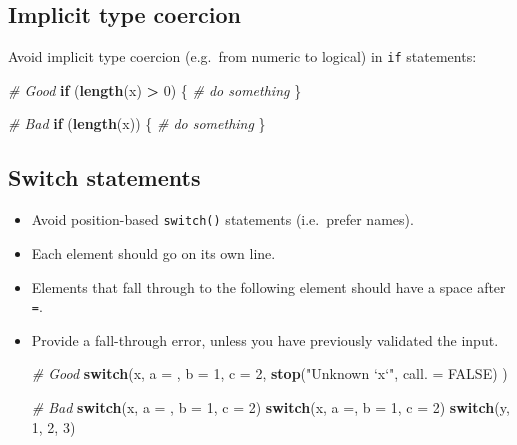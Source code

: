 \documentclass[
]{book}
\newenvironment{Shaded}{\begin{snugshade}}{\end{snugshade}}
\newcommand{\CommentTok}[1]{\textcolor[rgb]{0.56,0.35,0.01}{\textit{#1}}}
\newcommand{\ControlFlowTok}[1]{\textcolor[rgb]{0.13,0.29,0.53}{\textbf{#1}}}
\newcommand{\DataTypeTok}[1]{\textcolor[rgb]{0.13,0.29,0.53}{#1}}
\newcommand{\DecValTok}[1]{\textcolor[rgb]{0.00,0.00,0.81}{#1}}
\newcommand{\KeywordTok}[1]{\textcolor[rgb]{0.13,0.29,0.53}{\textbf{#1}}}
\newcommand{\NormalTok}[1]{#1}
\newcommand{\OperatorTok}[1]{\textcolor[rgb]{0.81,0.36,0.00}{\textbf{#1}}}
\newcommand{\OtherTok}[1]{\textcolor[rgb]{0.56,0.35,0.01}{#1}}
\newcommand{\StringTok}[1]{\textcolor[rgb]{0.31,0.60,0.02}{#1}}
\begin{document}
\hypertarget{implicit-type-coercion}{%
\subsection{Implicit type coercion}\label{implicit-type-coercion}}

Avoid implicit type coercion (e.g.~from numeric to logical) in \texttt{if} statements:

\begin{Shaded}
\begin{Highlighting}[]
\CommentTok{# Good}
\ControlFlowTok{if}\NormalTok{ (}\KeywordTok{length}\NormalTok{(x) }\OperatorTok{>}\StringTok{ }\DecValTok{0}\NormalTok{) \{}
    \CommentTok{# do something}
\NormalTok{\}}

\CommentTok{# Bad}
\ControlFlowTok{if}\NormalTok{ (}\KeywordTok{length}\NormalTok{(x)) \{}
    \CommentTok{# do something}
\NormalTok{\}}
\end{Highlighting}
\end{Shaded}

\hypertarget{switch-statements}{%
\subsection{Switch statements}\label{switch-statements}}

\begin{itemize}
\item
  Avoid position-based \texttt{switch()} statements (i.e.~prefer names).
\item
  Each element should go on its own line.
\item
  Elements that fall through to the following element should have a space after
  \texttt{=}.
\item
  Provide a fall-through error, unless you have previously validated the input.

\begin{Shaded}
\begin{Highlighting}[]
\CommentTok{# Good }
\ControlFlowTok{switch}\NormalTok{(x, }
    \DataTypeTok{a =}\NormalTok{ ,}
    \DataTypeTok{b =} \DecValTok{1}\NormalTok{, }
    \DataTypeTok{c =} \DecValTok{2}\NormalTok{,}
    \KeywordTok{stop}\NormalTok{(}\StringTok{"Unknown `x`"}\NormalTok{, }\DataTypeTok{call. =} \OtherTok{FALSE}\NormalTok{)}
\NormalTok{)}

\CommentTok{# Bad}
\ControlFlowTok{switch}\NormalTok{(x, }\DataTypeTok{a =}\NormalTok{ , }\DataTypeTok{b =} \DecValTok{1}\NormalTok{, }\DataTypeTok{c =} \DecValTok{2}\NormalTok{)}
\ControlFlowTok{switch}\NormalTok{(x, }\DataTypeTok{a =}\NormalTok{, }\DataTypeTok{b =} \DecValTok{1}\NormalTok{, }\DataTypeTok{c =} \DecValTok{2}\NormalTok{)}
\ControlFlowTok{switch}\NormalTok{(y, }\DecValTok{1}\NormalTok{, }\DecValTok{2}\NormalTok{, }\DecValTok{3}\NormalTok{)}
\end{Highlighting}
\end{Shaded}
\end{itemize}
\end{document}
